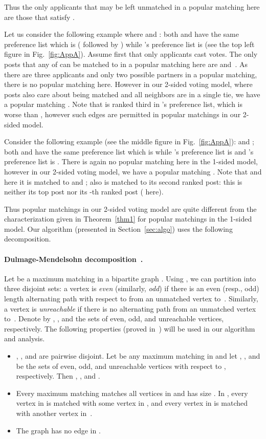 \documentclass[11pt]{llncs}
\begin{document}
Thus the only applicants that may be left unmatched in a popular matching here are those 
 that satisfy .

Let us consider the following example where  and : 
both  and  have the same preference list which is  ( followed by 
) while 's preference list is  (see the top left figure in 
Fig.~\ref{fig:AppA}). Assume first that only applicants cast votes.
The only posts that any of  can be matched to in a popular matching here 
are  and~.  As there are three applicants and only two possible partners 
in a popular matching, there is no popular matching here. However in our 2-sided voting model, 
where posts also care about being matched and all neighbors are in a single tie, 
we have a popular matching . Note that  is ranked third 
in 's preference list, which is worse than , however such edges are permitted 
in popular matchings in our 2-sided model.

Consider the following example (see the middle figure in Fig.~\ref{fig:AppA}):  
and ; both  and  have the same preference list which is  
while 's preference list is  and 's preference list is . There 
is again no popular matching here in the 1-sided model, however in our 2-sided voting model, we have 
a popular matching . Note that  and here it is 
matched to  and ; also  is matched to its second ranked post: this 
is neither its top post nor its  -th ranked post ( here).

Thus popular matchings in our 2-sided voting model are quite different from the 
characterization given in Theorem~\ref{thm1} for popular matchings in the 1-sided model. Our 
algorithm (presented in Section~\ref{sec:algo}) uses the following decomposition.

\paragraph{Dulmage-Mendelsohn decomposition~\cite{dulmage}.} Let  be a maximum matching in 
a bipartite graph . Using , we can partition  into three 
disjoint sets: a vertex  is \emph {even} (similarly, \emph {odd}) if there is an even 
(resp., odd) length alternating path with respect to  from an unmatched vertex to~.
Similarly, a vertex  is \emph {unreachable} if there is no alternating path from an 
unmatched vertex to~. Denote by , , and  the sets of 
even, odd, and unreachable vertices, respectively. The following properties (proved 
in~\cite{GGL95}) will be used in our algorithm and analysis.
\begin{itemize}
\item , , and  are pairwise disjoint. Let  be any
maximum matching in  and let , , and  be the sets 
of even, odd, and unreachable vertices with respect to , respectively. Then , , and .
\item Every maximum matching  matches all vertices in  and 
has size . In , every vertex in  is matched 
with some vertex in , and every vertex in  is matched with another 
vertex in~. 
\item The graph  has no edge in .
\end{itemize}
\end{document}
